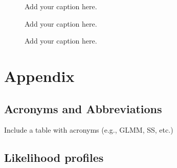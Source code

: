 \documentclass[
]{scrartcl}
\begin{document}
\newpage{}

\begin{figure}


\caption{\label{fig-map-grid-agg2}Add your caption here.}

\end{figure}%

\newpage{}

\begin{figure}


\caption{\label{fig-comp-catch}Add your caption here.}

\end{figure}%

\newpage{}

\begin{figure}


\caption{\label{fig-comp-cpue}Add your caption here.}

\end{figure}%

\newpage{}

\section{Appendix}\label{appendix}

\subsection{Acronyms and
Abbreviations}\label{acronyms-and-abbreviations}

Include a table with acronyms (e.g., GLMM, SS, etc.)

\subsection{Likelihood profiles}\label{likelihood-profiles}
\end{document}
